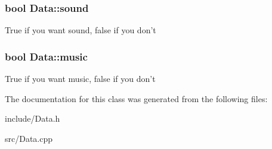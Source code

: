 \subsubsection{\setlength{\rightskip}{0pt plus 5cm}bool {\bf Data::sound}\hspace{0.3cm}{\tt  [protected]}}\label{classData_1c495f77d4d32410c20567660b1a664c}


True if you want sound, false if you don't 
\subsubsection{\setlength{\rightskip}{0pt plus 5cm}bool {\bf Data::music}\hspace{0.3cm}{\tt  [protected]}}\label{classData_b08de3d1253a66a37ae6764c53dcf113}


True if you want music, false if you don't 

The documentation for this class was generated from the following files:\begin{CompactItemize}
\item 
include/Data.h\item 
src/Data.cpp\end{CompactItemize}
